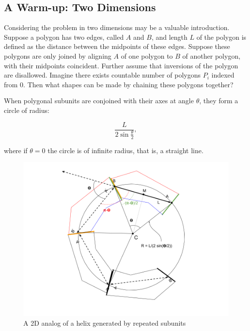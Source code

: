 \documentclass[mathematics,article,submit,pdftex,moreauthors]{Definitions/mdpi}
\begin{document}
\subsection{A Warm-up: Two Dimensions}

Considering the problem in two dimensions may be a valuable introduction.
Suppose a polygon has two edges, called $A$ and $B$, and length $L$ of the
polygon is defined as the distance between the midpoints of these edges.
Suppose these
polygons are only joined by aligning $A$ of one polygon to $B$ of another polygon, with their midpoints coincident. Further assume that inversions of the polygon are disallowed.  Imagine there exists
countable number of polygons $P_i$ indexed from $0$. Then what shapes can be made by chaining these
polygons together?

\begin{Theorem}
  When polygonal subunits are conjoined with their axes at angle $\theta$, they form a
  circle of radius:

\begin{linenomath}
\begin{equation}
\frac{L}{2 \sin{\frac{\theta}{2}}},
\end{equation}
\end{linenomath}

where if $\theta = 0$ the circle is of infinite radius, that is, a straight line.
  \end{Theorem}
\begin{figure}
  \centering
  \captionsetup{justification=centering}
     \includegraphics[width=10.5 cm]{figures/2DPolygonStacking.png}
     \caption{A 2D analog of a helix generated by repeated subunits}
  \label{fig:prismdiagram}
\end{figure}
\unskip
\end{document}
